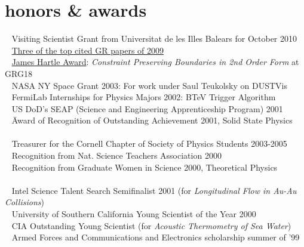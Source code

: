 \documentclass[]{seiler-resume}
\begin{document}
\section{honors \& awards}
\begin{tabbing}
{\textbullet~  Visiting Scientist Grant from Universitat de les Illes Balears for October 2010}
\\{\textbullet~ \href{http://www.slac.stanford.edu/spires/topcites/2009/eprints/to_gr-qc_annual.shtml}{Three of the top cited GR papers of 2009}}
\\{\textbullet~ \href{http://arxiv.org/pdf/0709.0942}{James Hartle Award}:} \textit{Constraint Preserving Boundaries in 2nd Order Form} at GRG18
\\{\textbullet~ NASA NY Space Grant 2003:} For work under Saul Teukolsky on DUSTVis
\\{\textbullet~ FermiLab Internships for Physics Majors 2002:} BTeV Trigger Algorithm
\\{\textbullet~ US DoD's SEAP (Science and Engineering Apprenticeship Program) 2001}
\\{\textbullet~} \={Award of Recognition of Outstanding Achievement 2001, Solid State Physics}
\\ 
\\{\textbullet~ Treasurer for the Cornell Chapter of Society of Physics Students 2003-2005}
\\{\textbullet~ Recognition from Nat. Science Teachers Association 2000}
\\{\textbullet~ Recognition from Graduate Women in Science 2000, Theoretical Physics }
\\ 
\\{\textbullet~ Intel Science Talent Search Semifinalist 2001 (for \textit{Longitudinal Flow in Au-Au Collisions})} 
\\{\textbullet~ University of Southern California Young Scientist of the Year 2000 }
\\{\textbullet~ CIA Outstanding Young Scientist (for \textit{Acoustic Thermometry of Sea Water}) }
\\{\textbullet~ Armed Forces and Communications and Electronics scholarship summer of '99 }

\end{tabbing}
\end{document}
